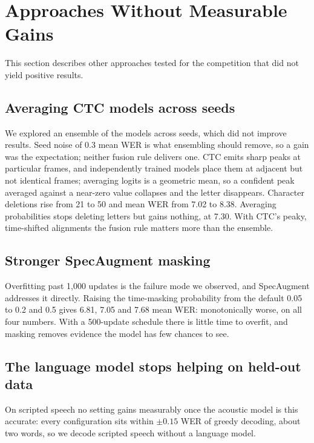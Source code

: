 \section{Approaches Without Measurable Gains}
\label{sec:negative}

This section describes other approaches tested for the competition that did not
yield positive results.

\subsection{Averaging CTC models across seeds}

We explored an ensemble of the models across seeds, which did not improve
results. Seed noise of 0.3 mean WER is what ensembling should remove, so a gain
was the expectation; neither fusion rule delivers one. CTC emits sharp peaks at particular
frames, and independently trained models place them at adjacent but not
identical frames; averaging logits is a geometric mean, so a confident peak
averaged against a near-zero value collapses and the letter disappears.
Character deletions rise from 21 to 50 and mean WER from 7.02 to 8.38.
Averaging probabilities stops deleting letters but gains nothing, at 7.30. With
CTC's peaky, time-shifted alignments the fusion rule matters more than the
ensemble.

\subsection{Stronger SpecAugment masking}

Overfitting past 1{,}000 updates is the failure mode we observed, and
SpecAugment \cite{park2019specaugment} addresses it directly. Raising the
time-masking probability from the default 0.05 to 0.2 and 0.5 gives 6.81, 7.05
and 7.68 mean WER: monotonically worse, on all four numbers. With a 500-update
schedule there is little time to overfit, and masking removes evidence the
model has few chances to see.

\subsection{The language model stops helping on held-out data}
\label{sec:lmneg}

On scripted speech no setting gains measurably once the acoustic model is this
accurate: every configuration sits within $\pm0.15$ WER of greedy decoding,
about two words, so we decode scripted speech without a language model.

